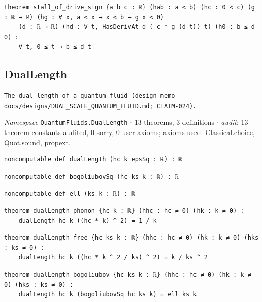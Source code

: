 \begin{lstlisting}[style=leancat]
theorem stall_of_drive_sign {a b c : ℝ} (hab : a < b) (hc : 0 < c) (g : ℝ → ℝ) (hg : ∀ x, a < x → x < b → g x < 0)
    (d : ℝ → ℝ) (hd : ∀ t, HasDerivAt d (-c * g (d t)) t) (h0 : b ≤ d 0) :
    ∀ t, 0 ≤ t → b ≤ d t
\end{lstlisting}

\subsection{DualLength}\label{appA:DualLength}
{\footnotesize\raggedright\texttt{The dual length of a quantum fluid (design memo docs/\allowbreak{}designs/\allowbreak{}DUAL\_\allowbreak{}SCALE\_\allowbreak{}QUANTUM\_\allowbreak{}FLUID.\allowbreak{}md; CLAIM-\allowbreak{}024).\allowbreak{}}\par}
{\footnotesize\raggedright\emph{Namespace} \texttt{QuantumFluids.\allowbreak{}DualLength} $\cdot$ 13 theorems, 3 definitions $\cdot$ \emph{audit}: 13 theorem constants audited, 0 sorry, 0 user axioms; axioms used: Classical.choice, Quot.sound, propext.\par}
\vspace{1pt}
\begin{lstlisting}[style=leancat]
noncomputable def dualLength (hc k epsSq : ℝ) : ℝ
\end{lstlisting}

\begin{lstlisting}[style=leancat]
noncomputable def bogoliubovSq (hc ks k : ℝ) : ℝ
\end{lstlisting}

\begin{lstlisting}[style=leancat]
noncomputable def ell (ks k : ℝ) : ℝ
\end{lstlisting}

\begin{lstlisting}[style=leancat]
theorem dualLength_phonon {hc k : ℝ} (hhc : hc ≠ 0) (hk : k ≠ 0) :
    dualLength hc k ((hc * k) ^ 2) = 1 / k
\end{lstlisting}

\begin{lstlisting}[style=leancat]
theorem dualLength_free {hc ks k : ℝ} (hhc : hc ≠ 0) (hk : k ≠ 0) (hks : ks ≠ 0) :
    dualLength hc k ((hc * k ^ 2 / ks) ^ 2) = k / ks ^ 2
\end{lstlisting}

\begin{lstlisting}[style=leancat]
theorem dualLength_bogoliubov {hc ks k : ℝ} (hhc : hc ≠ 0) (hk : k ≠ 0) (hks : ks ≠ 0) :
    dualLength hc k (bogoliubovSq hc ks k) = ell ks k
\end{lstlisting}

